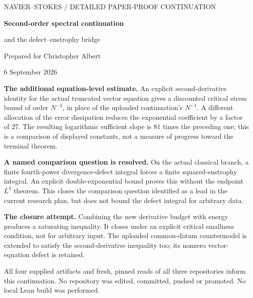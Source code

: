 \documentclass[11pt,a4paper]{article}
\theoremstyle{definition}\newtheorem{definition}[theorem]{Definition}
\theoremstyle{remark}\newtheorem{remark}[theorem]{Remark}
\numberwithin{equation}{section}
\begin{document}
\hypersetup{pageanchor=false}
\begin{titlepage}\thispagestyle{empty}\setlength{\parindent}{0pt}
\vspace*{8mm}
{\sffamily\small\color{blue!40!black} NAVIER--STOKES / DETAILED PAPER-PROOF CONTINUATION\par}
\vspace{10mm}
{\LARGE\bfseries Second-order spectral continuation\par}
\vspace{5mm}
{\Large and the defect--enstrophy bridge\par}
\vspace{10mm}
Prepared for Christopher Albert\par
6 September 2026\par
\vspace{8mm}
\noindent\textbf{The additional equation-level estimate.} An explicit second-derivative identity for the actual truncated vector equation gives a discounted critical stress bound of order $N^{-3}$, in place of the uploaded continuation's $N^{-1}$. A different allocation of the error dissipation reduces the exponential coefficient by a factor of $27$. The resulting logarithmic sufficient slope is $81$ times the preceding one; this is a comparison of displayed constants, not a measure of progress toward the terminal theorem.

\noindent\textbf{A named comparison question is resolved.} On the actual classical branch, a finite fourth-power divergence-defect integral forces a finite squared-enstrophy integral. An explicit double-exponential bound proves this without the endpoint $L^3$ theorem. This closes the comparison question identified as a lead in the current research plan, but does not bound the defect integral for arbitrary data.

\noindent\textbf{The closure attempt.} Combining the new derivative budget with energy produces a saturating inequality. It closes under an explicit critical smallness condition, not for arbitrary input. The uploaded common-datum countermodel is extended to satisfy the second-derivative inequality too; its nonzero vector-equation defect is retained.\par
\vspace{4mm}
\noindent{}\par
\vfill
{\small All four supplied artifacts and fresh, pinned reads of all three repositories inform this continuation. No repository was edited, committed, pushed or promoted. No local Lean build was performed.}
\end{titlepage}
\hypersetup{pageanchor=true}
{\small\setlength{\parskip}{0pt}\tableofcontents}
\newpage
\end{document}
